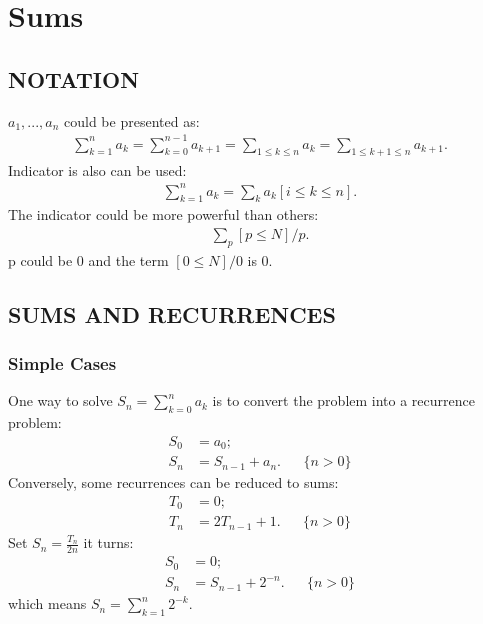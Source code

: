 \documentclass{article}
\begin{document}
\section{Sums}
\subsection{NOTATION}
$a_1,...,a_n$ could be presented as:
\begin{align}
\sum_{k=1}^{n}{a_k} = \sum_{k=0}^{n-1}{a_{k+1}} = \sum_{1\le k \le n}{a_k} = \sum_{1\le k+1 \le n}{a_{k+1}}.
\end{align}
Indicator is also can be used:
\begin{align}
\sum_{k=1}^{n}{a_k} = \sum_{k}{a_k}[i\le k \le n].
\end{align}
The indicator could be more powerful than others:
\begin{align}
\sum_{p}[p\le N]/p.
\end{align}
p could be 0 and the term $[0\le N]/0$ is 0.

\subsection{SUMS AND RECURRENCES}
\subsubsection{Simple Cases}
One way to solve $S_n = \sum_{k=0}^n{a_k}$ is to convert the problem into a recurrence problem:
\begin{align}
S_0 &= a_0;\\
S_n &= S_{n-1} + a_n. && \{n>0\}
\end{align}
Conversely, some recurrences can be reduced to sums:
\begin{align}
T_0 &= 0;\\
T_n &= 2T_{n-1}+1.&& \{n>0\}
\end{align}
Set $S_n = \frac{T_n}{2n}$ it turns:
\begin{align}
S_0 &= 0;\\
S_n &= S_{n-1} + 2^{-n}. && \{n>0\}
\end{align}
which means $S_n = \sum_{k=1}^{n}{2^{-k}}$.
\end{document}
